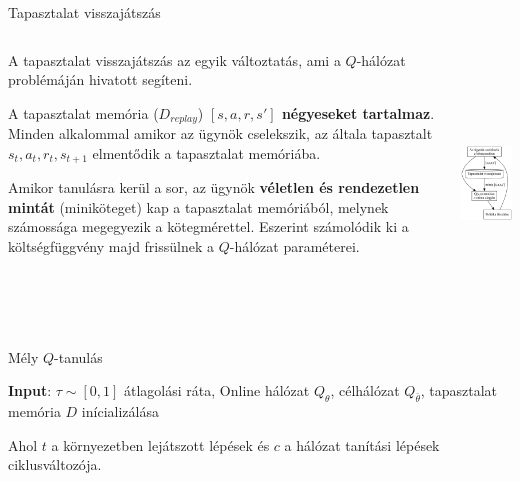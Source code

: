 \documentclass[english, aspectratio=169]{beamer}
\begin{document}
\begin{frame}{Tapasztalat visszajátszás}
\begin{columns}
\begin{column}{.65\textwidth}
A tapasztalat visszajátszás az egyik változtatás, ami a $Q$-hálózat problémáján hivatott segíteni.\par\smallskip
A tapasztalat memória ($D_{replay}$) \textbf{$[s,a,r,s']$ négyeseket tartalmaz}. Minden alkalommal amikor az ügynök cselekszik, az általa tapasztalt $s_t, a_t, r_t, s_{t+1}$ elmentődik a tapasztalat memóriába.\par\smallskip
Amikor tanulásra kerül a sor, az ügynök \textbf{véletlen és rendezetlen mintát} (miniköteget) kap a tapasztalat memóriából, melynek számossága megegyezik a kötegmérettel. Eszerint számolódik ki a költségfüggvény majd frissülnek a $Q$-hálózat paraméterei.
\end{column}
\begin{column}{.35\textwidth}
\begin{center}
\includegraphics[height=7cm, keepaspectratio]{../../5_ql/doc/graphs/ql_4.png}
\end{center}
\end{column}
\end{columns}
\end{frame}

\begin{frame}{}
\begin{algorithm}[H]
\caption{Mély $Q$-tanulás}
\SetAlgoLined
\textbf{Input}: $\tau \sim [0,1]$ átlagolási ráta,
Online hálózat $Q_\theta$, célhálózat $Q_{\bar{\theta}}$, tapasztalat memória $D$ inícializálása\;
\end{algorithm}
Ahol $t$ a környezetben lejátszott lépések és $c$ a hálózat tanítási lépések ciklusváltozója.
\end{frame}
\end{document}
